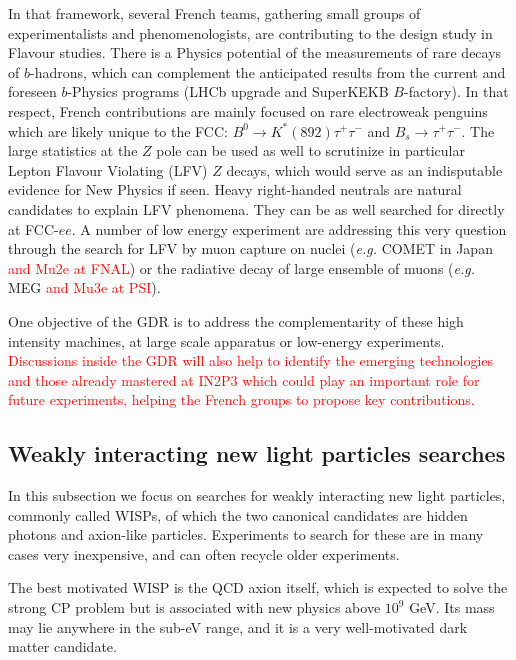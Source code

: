 In that framework, several French teams, gathering small groups of experimentalists and phenomenologists, are contributing to the design study in Flavour studies.  
There is a Physics potential of the measurements of rare decays of $b$-hadrons, which can complement  the anticipated results from the current and foreseen $b$-Physics programs (LHCb upgrade and SuperKEKB $B$-factory). In that respect, French contributions are mainly focused on rare electroweak penguins which are likely unique to the FCC: $B^0 \to K^*(892) \tau^+\tau^-$ and $B_s \to \tau^+ \tau^-$.   
The large statistics at the $Z$ pole can be used as well to scrutinize in particular Lepton Flavour Violating (LFV) $Z$ decays, which would serve as an indisputable evidence for New Physics if seen. Heavy right-handed neutrals are natural candidates to explain LFV phenomena. They can be as well searched for directly at FCC-$ee$. A number of low energy experiment are addressing this very question through the search for LFV by muon capture on nuclei ({\it e.g.} COMET in Japan \textcolor{red}{and Mu2e at FNAL}) or the radiative decay of large ensemble of muons ({\it e.g.} MEG \textcolor{red}{and Mu3e at PSI}). 

One objective of the GDR is to address the complementarity of these high intensity machines,  at large scale apparatus or low-energy experiments.  \textcolor{red}{Discussions inside the GDR will also help to identify the emerging technologies and those already mastered at IN2P3 which could play an important role for future experiments, helping the French groups to propose key contributions.} 

\subsection{Weakly interacting new light particles searches}

In this subsection we focus on searches for weakly interacting new light particles, commonly called WISPs, of which the two canonical candidates are hidden photons and axion-like particles. Experiments to search for these are in many cases very inexpensive, and can often recycle older experiments. 


The best motivated WISP is the QCD axion itself, which is expected to solve the strong CP problem but is associated with new physics above $10^9$ GeV. Its mass may lie anywhere in the sub-eV range, and it is a very well-motivated dark matter candidate. 



